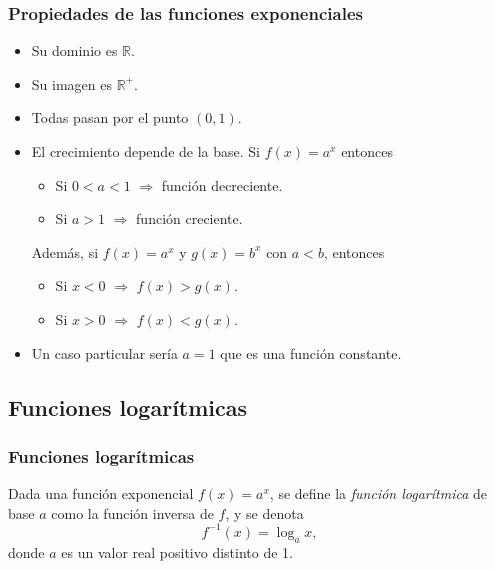 \begin{frame}
\frametitle{Propiedades de las funciones exponenciales}
\begin{itemize}
\item Su dominio es $\mathbb{R}$.
\item Su imagen es $\mathbb{R}^+$.
\item Todas pasan por el punto $(0,1)$.
\item El crecimiento depende de la base. Si $f(x)=a^x$ entonces
\begin{itemize}
\item Si $0<a<1$ $\Rightarrow$ función decreciente.
\item Si $a>1$ $\Rightarrow$ función creciente. 
\end{itemize}
Además, si $f(x)=a^x$ y $g(x)=b^x$ con $a<b$, entonces
\begin{itemize}
\item Si $x<0$ $\Rightarrow$ $f(x)>g(x)$.
\item Si $x>0$ $\Rightarrow$ $f(x)<g(x)$.
\end{itemize}

\item Un caso particular sería $a=1$ que es una función constante.
\end{itemize}
\end{frame} 



\subsection{Funciones logarítmicas}
\begin{frame}
\frametitle{Funciones logarítmicas}
\begin{definicion}
Dada una función exponencial $f(x)=a^x$, se define la \emph{función logarítmica} de base $a$ como la función inversa de
$f$, y se denota
\[
f^{-1}(x)=\log_a x,
\]
donde $a$ es un valor real positivo distinto de 1.
\end{definicion}
\begin{center}
\scalebox{1}{}
\end{center}
\end{frame} 


